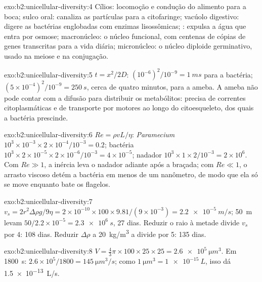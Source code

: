 \begin{solution}{exo:b2:unicellular-diversity:4}
Cílios: locomoção e condução do alimento para a boca; sulco oral:
canaliza as partículas para a citofaringe; vacúolo digestivo: digere
as bactérias englobadas com enzimas lisossômicas; :
expulsa a água que entra por osmose; macronúcleo: o núcleo funcional,
com centenas de cópias de genes transcritas para a vida diária;
micronúcleo: o núcleo diploide germinativo, usado na meiose e na
conjugação.
\end{solution}

\begin{solution}{exo:b2:unicellular-diversity:5}
$t = x^2/2D$: $(10^{-6})^2/10^{-9} = \qty{1}{ms}$ para a bactéria;
$(5\times 10^{-4})^2/10^{-9} = \qty{250}{s}$, cerca de quatro minutos,
para a ameba. A ameba não pode contar com a difusão para distribuir
os metabólitos: precisa de correntes citoplasmáticas e de transporte
por motores ao longo do citoesqueleto, dos quais a bactéria prescinde.
\end{solution}

\begin{solution}{exo:b2:unicellular-diversity:6}
$Re = \rho vL/\eta$: \emph{Paramecium} $10^3\times 10^{-3}\times
2\times 10^{-4}/10^{-3} = 0.2$; bactéria $10^3\times 2\times
10^{-5}\times 2\times 10^{-6}/10^{-3} = 4\times 10^{-5}$; nadador
$10^3\times 1\times 2/10^{-3} = 2\times 10^6$. Com $Re \gg 1$, a inércia
leva o nadador adiante após a braçada; com $Re \ll 1$, o arrasto
viscoso detém a bactéria em menos de um nanômetro, de modo que ela só
se move enquanto bate os flagelos.
\end{solution}

\begin{solution}{exo:b2:unicellular-diversity:7}
$v_s = 2r^2\Delta\rho g/9\eta = 2\times 10^{-10}\times 100\times
9.81/(9\times 10^{-3}) = \qty{2.2e-5}{m/s}$; \qty{50}{m} levam
$50/2.2\times 10^{-5} = \qty{2.3e6}{s}$, 27 dias. Reduzir o raio à
metade divide $v_s$ por 4: 108 dias. Reduzir $\Delta\rho$ a
\qty{20}{kg/m^3} a divide por 5: 135 dias.
\end{solution}

\begin{solution}{exo:b2:unicellular-diversity:8}
$V = \tfrac{4}{3}\pi\times 100\times 25\times 25 =
\qty{2.6e5}{\micro m^3}$. Em \qty{1800}{s}: $2.6\times 10^5/1800 =
\qty{145}{\micro m^3/s}$; como $\qty{1}{\micro m^3} =
\qty{1e-15}{L}$, isso dá \qty{1.5e-13}{L/s}.
\end{solution}

